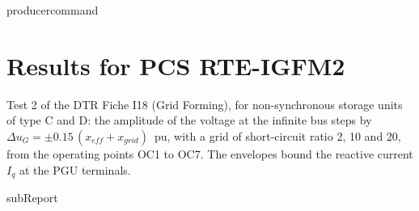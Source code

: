 {{ producercommand }}



    \section{Results for PCS RTE-IGFM2}

    Test 2 of the DTR Fiche I18 (Grid Forming), for non-synchronous storage units of type C
    and D: the amplitude of the voltage at the infinite bus steps by
    \(\Delta u_G = \pm 0.15\,(x_{eff} + x_{grid})\)~pu, with a grid of short-circuit ratio 2, 10
    and 20, from the operating points OC1 to OC7. The envelopes bound the reactive current
    \(I_q\) at the PGU terminals.

    {{subReport}}
    \newpage

